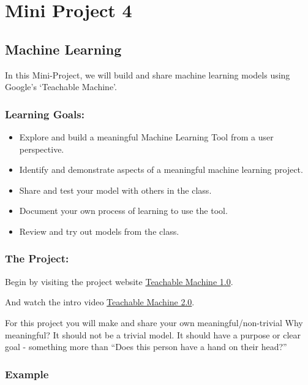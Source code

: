 \clearpage
\chapter{Mini Project 4}

\section{Machine Learning}

In this Mini-Project, we will build and share machine learning models using Google's `Teachable Machine'.

\subsection*{Learning Goals:}

\begin{itemize}
    \item Explore and build a meaningful Machine Learning Tool from a user perspective.
    \item Identify and demonstrate aspects of a meaningful machine learning project.
    \item Share and test your model with others in the class.
    \item Document your own process of learning to use the tool.
    \item Review and try out models from the class.
\end{itemize}

\subsection*{The Project:}

\noindent Begin by visiting the project website \href{https://teachablemachine.withgoogle.com/}{Teachable Machine 1.0}. \vspace*{1em}

\noindent And watch the intro video \href{https://www.youtube.com/watch?v=T2qQGqZxkD0&t=3s}{Teachable Machine 2.0}. \vspace*{1em}

For this project you will make and share your own meaningful/non-trivial Why meaningful? It should not be a trivial model. It should have a purpose or clear goal - something more than “Does this person 
have a hand on their head?”

\subsection*{Example}

